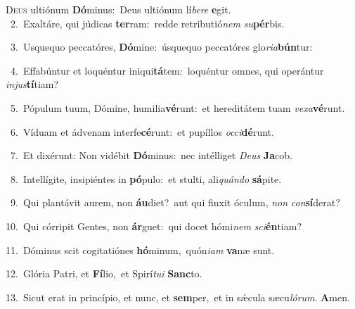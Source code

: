 \lettrine{\initial\textcolor{\initialcolor}{D}}{eus} ultiónum \textbf{Dó}\-minus:~\star Deus ultiónum lí\-\textit{be}\-\textit{re} \textbf{e}\-git.\\
{\numbfont\textcolor{\numbcolor}{~2.}}~Exaltáre, qui júdicas \textbf{ter}\-ram:~\star redde retributió\textit{nem} \textit{su}\-\textbf{pér}bis.\par
{\numbfont\textcolor{\numbcolor}{~3.}}~Usquequo peccatóres, \textbf{Dó}\-mine:~\star úsquequo peccatóres glo\-\textit{ri}\-\textit{a}\textbf{bún}tur:\par
{\numbfont\textcolor{\numbcolor}{~4.}}~Effabúntur et loquéntur iniqui\-\textbf{tá}\-tem:~\star loquéntur omnes, qui operántur \textit{in}\-\textit{jus}\textbf{tí}tiam?\par
{\numbfont\textcolor{\numbcolor}{~5.}}~Pópulum tuum, Dómine, humilia\-\textbf{vé}\-runt:~\star et hereditátem tuam \textit{ve}\-\textit{xa}\textbf{vé}runt.\par
{\numbfont\textcolor{\numbcolor}{~6.}}~Víduam et ádvenam interfe\-\textbf{cé}\-runt:~\star et pupíllos \textit{oc}\-\textit{ci}\textbf{dé}runt.\par
{\numbfont\textcolor{\numbcolor}{~7.}}~Et dixérunt: Non vidébit \textbf{Dó}\-minus:~\star nec intélliget \textit{De}\-\textit{us} \textbf{Ja}\-cob.\par
{\numbfont\textcolor{\numbcolor}{~8.}}~Intellígite, insipiéntes in \textbf{pó}\-pulo:~\star et stulti, ali\-\textit{quán}\-\textit{do} \textbf{sá}\-pite.\par
{\numbfont\textcolor{\numbcolor}{~9.}}~Qui plantávit aurem, non \textbf{áu}\-diet?~\star aut qui finxit óculum, \textit{non} \textit{con}\-\textbf{sí}derat?\par
{\numbfont\textcolor{\numbcolor}{10.}}~Qui córripit Gentes, non \textbf{ár}\-guet:~\star qui docet hómi\textit{nem} \textit{sci}\-\textbf{én}tiam?\par
{\numbfont\textcolor{\numbcolor}{11.}}~Dóminus scit cogitatiónes \textbf{hó}\-minum,~\star quón\-\textit{i}\-\textit{am} \textbf{va}\-næ sunt.\par
{\numbfont\textcolor{\numbcolor}{12.}}~Glória Patri, et \textbf{Fí}\-lio,~\star et Spirí\-\textit{tu}\-\textit{i} \textbf{Sanc}\-to.\par
{\numbfont\textcolor{\numbcolor}{13.}}~Sicut erat in princípio, et nunc, et \textbf{sem}\-per,~\star et in sǽcula sæcu\-\textit{ló}\-\textit{rum}. \textbf{A}\-men.\par

